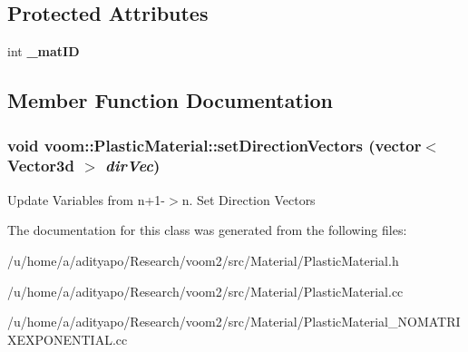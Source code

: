 \subsection*{Protected Attributes}
\begin{DoxyCompactItemize}
\item 
\hypertarget{classvoom_1_1_plastic_material_a60a9f68ef337b748c6e147b7259d3740}{
int {\bfseries \_\-matID}}
\label{classvoom_1_1_plastic_material_a60a9f68ef337b748c6e147b7259d3740}

\end{DoxyCompactItemize}


\subsection{Member Function Documentation}
\hypertarget{classvoom_1_1_plastic_material_adeed31ed97955b441efa8beeb56ce7e1}{
\subsubsection[{setDirectionVectors}]{\setlength{\rightskip}{0pt plus 5cm}void voom::PlasticMaterial::setDirectionVectors (vector$<$ Vector3d $>$ {\em dirVec})}}
\label{classvoom_1_1_plastic_material_adeed31ed97955b441efa8beeb56ce7e1}


Update Variables from n+1-\/$>$n. Set Direction Vectors 

The documentation for this class was generated from the following files:\begin{DoxyCompactItemize}
\item 
/u/home/a/adityapo/Research/voom2/src/Material/PlasticMaterial.h\item 
/u/home/a/adityapo/Research/voom2/src/Material/PlasticMaterial.cc\item 
/u/home/a/adityapo/Research/voom2/src/Material/PlasticMaterial\_\-NOMATRIXEXPONENTIAL.cc\end{DoxyCompactItemize}
